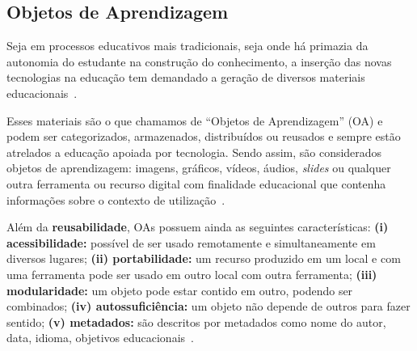 

\subsection{Objetos de Aprendizagem}
Seja em processos educativos mais tradicionais, seja onde há primazia da autonomia do estudante na construção do conhecimento, a inserção das novas tecnologias na educação tem demandado a geração de diversos materiais educacionais~\citep{Tarouco:2004}.

Esses materiais são o que chamamos de ``Objetos de Aprendizagem'' (OA) e podem ser categorizados, armazenados, distribuídos ou reusados e sempre estão atrelados a educação apoiada por tecnologia. Sendo assim, são considerados objetos de aprendizagem: imagens, gráficos, vídeos, áudios, \textit{slides} ou qualquer outra ferramenta ou recurso digital com finalidade educacional que contenha informações sobre o contexto de utilização~\citep{Tarouco:2004}.

Além da \textbf{reusabilidade}, OAs possuem ainda as seguintes características: \textbf{(i) acessibilidade:} possível de ser usado remotamente e simultaneamente em diversos lugares; \textbf{(ii) portabilidade:} um recurso produzido em um local e com uma ferramenta pode ser usado em outro local com outra ferramenta; \textbf{(iii) modularidade:} um objeto pode estar contido em outro, podendo ser combinados; \textbf{(iv) autossuficiência:} um objeto não depende de outros para fazer sentido; \textbf{(v) metadados:} são descritos por metadados como nome do autor, data, idioma, objetivos educacionais~\citep{Tarouco:2004,Sabbatini:2013}.

